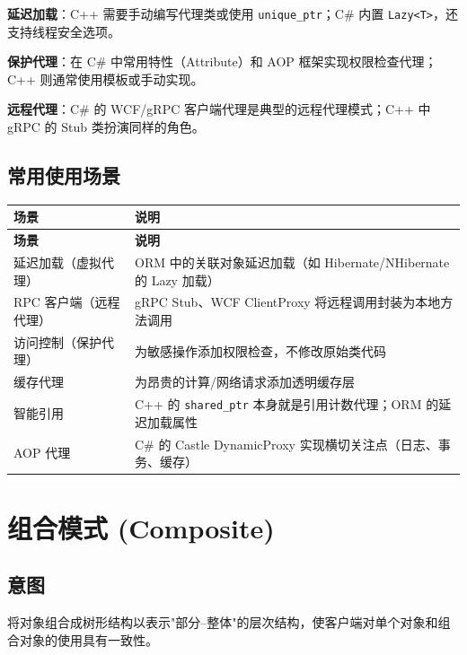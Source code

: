 \documentclass[12pt,a4paper,fontset=fandol]{ctexbook}
\begin{document}
\begin{compare}
\textbf{延迟加载}：C++ 需要手动编写代理类或使用 \texttt{unique\_ptr}；C\# 内置 \texttt{Lazy<T>}，还支持线程安全选项。

\textbf{保护代理}：在 C\# 中常用特性（Attribute）和 AOP 框架实现权限检查代理；C++ 则通常使用模板或手动实现。

\textbf{远程代理}：C\# 的 WCF/gRPC 客户端代理是典型的远程代理模式；C++ 中 gRPC 的 Stub 类扮演同样的角色。
\end{compare}

\section{常用使用场景}

\begin{longtable}{>{\raggedright\arraybackslash}p{4.5cm} >{\raggedright\arraybackslash}p{8.5cm}}
\toprule
\textbf{场景} & \textbf{说明} \\
\midrule
\endfirsthead
\toprule
\textbf{场景} & \textbf{说明} \\
\midrule
\endhead
\bottomrule
\endfoot
延迟加载（虚拟代理） & ORM 中的关联对象延迟加载（如 Hibernate/\allowbreak{}\allowbreak{}NHibernate 的 Lazy 加载） \\
RPC 客户端（远程代理） & gRPC Stub、WCF ClientProxy 将远程调用封装为本地方法调用 \\
访问控制（保护代理） & 为敏感操作添加权限检查，不修改原始类代码 \\
缓存代理 & 为昂贵的计算/网络请求添加透明缓存层 \\
智能引用 & C++ 的 \texttt{shared\_ptr} 本身就是引用计数代理；ORM 的延迟加载属性 \\
AOP 代理 & C\# 的 Castle DynamicProxy 实现横切关注点（日志、事务、缓存） \\
\end{longtable}

\chapter{组合模式 (Composite)}

\section{意图}

将对象组合成树形结构以表示"部分--整体"的层次结构，使客户端对单个对象和组合对象的使用具有一致性。
\end{document}
